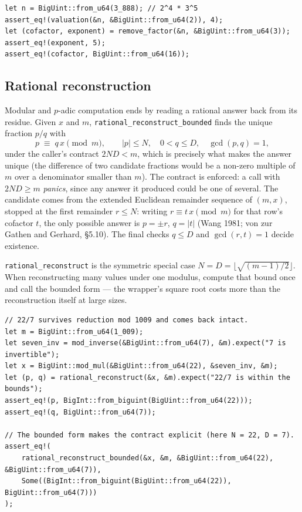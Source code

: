 \documentclass[11pt]{article}
\newcommand{\code}[1]{\texttt{#1}}
\begin{document}
\begin{lstlisting}
let n = BigUint::from_u64(3_888); // 2^4 * 3^5
assert_eq!(valuation(&n, &BigUint::from_u64(2)), 4);
let (cofactor, exponent) = remove_factor(&n, &BigUint::from_u64(3));
assert_eq!(exponent, 5);
assert_eq!(cofactor, BigUint::from_u64(16));
\end{lstlisting}

\subsection{Rational reconstruction}

Modular and $p$-adic computation ends by reading a rational answer back
from its residue. Given $x$ and $m$, \code{rational\_reconstruct\_bounded}
finds the unique fraction $p/q$ with
\begin{equation}
p \;\equiv\; q\,x \pmod{m},
\qquad |p| \le N,\quad 0 < q \le D,\quad \gcd(p, q) = 1,
\end{equation}
under the caller's contract $2ND < m$, which is precisely what makes the
answer unique (the difference of two candidate fractions would be a
non-zero multiple of $m$ over a denominator smaller than $m$). The
contract is enforced: a call with $2ND \ge m$ \emph{panics}, since any
answer it produced could be one of several. The
candidate comes from the extended Euclidean remainder sequence of
$(m, x)$, stopped at the first remainder $r \le N$: writing
$r \equiv t\,x \pmod m$ for that row's cofactor $t$, the only possible
answer is $p = \pm r$, $q = |t|$ (Wang 1981; von zur Gathen and Gerhard,
\S5.10). The final checks $q \le D$ and $\gcd(r, t) = 1$ decide existence.

\code{rational\_reconstruct} is the symmetric special case
$N = D = \bigl\lfloor \sqrt{(m-1)/2} \bigr\rfloor$. When reconstructing
many values under one modulus, compute that bound once and call the
bounded form --- the wrapper's square root costs more than the
reconstruction itself at large sizes.

\begin{lstlisting}
// 22/7 survives reduction mod 1009 and comes back intact.
let m = BigUint::from_u64(1_009);
let seven_inv = mod_inverse(&BigUint::from_u64(7), &m).expect("7 is invertible");
let x = BigUint::mod_mul(&BigUint::from_u64(22), &seven_inv, &m);
let (p, q) = rational_reconstruct(&x, &m).expect("22/7 is within the bounds");
assert_eq!(p, BigInt::from_biguint(BigUint::from_u64(22)));
assert_eq!(q, BigUint::from_u64(7));

// The bounded form makes the contract explicit (here N = 22, D = 7).
assert_eq!(
    rational_reconstruct_bounded(&x, &m, &BigUint::from_u64(22), &BigUint::from_u64(7)),
    Some((BigInt::from_biguint(BigUint::from_u64(22)), BigUint::from_u64(7)))
);
\end{lstlisting}
\end{document}

